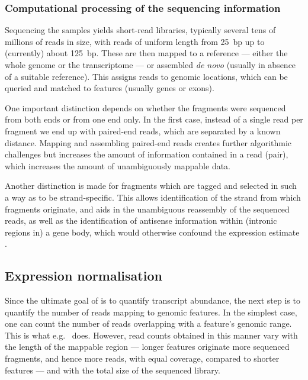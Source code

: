 \subsubsection{Computational processing of the sequencing information}

Sequencing the \rnaseq samples yields short-read libraries, typically several
tens of millions of reads in size, with reads of uniform length from \SI{25}{bp}
up to (currently) about \SI{125}{bp}. These are then mapped to a reference ---
either the whole genome or the transcriptome --- or assembled \emph{de novo}
(usually in absence of a suitable reference). This assigns reads to genomic
locations, which can be queried and matched to features (usually genes or
exons).

One important distinction depends on whether the \cdna fragments were sequenced
from both ends or from one end only. In the first case, instead of a single read
per fragment we end up with paired-end reads, which are separated by a known
distance. Mapping and assembling paired-end reads creates further algorithmic
challenges but increases the amount of information contained in a read (pair),
which increases the amount of unambiguously mappable data.\todo[ref]{}

Another distinction is made for fragments which are tagged and selected in such
a way as to be strand-specific. This allows identification of the strand from
which fragments originate, and aids in the unambiguous reassembly of the
sequenced reads, as well as the identification of antisense information within
(intronic regions in) a gene body, which would otherwise confound the expression
estimate \citep{Parkhomchuk:2009}.

\subsection{Expression normalisation}

Since the ultimate goal of \rnaseq is to quantify transcript abundance, the next
step is to quantify the number of reads mapping to genomic features. In the
simplest case, one can count the number of reads overlapping with a feature’s
genomic range. This is what e.g.\  \citep{Anders:2014} does.
However, read counts obtained in this manner vary with the length of the
mappable region --- longer features originate more sequenced fragments, and
hence more reads, with equal coverage, compared to shorter features --- and with
the total size of the sequenced library.

